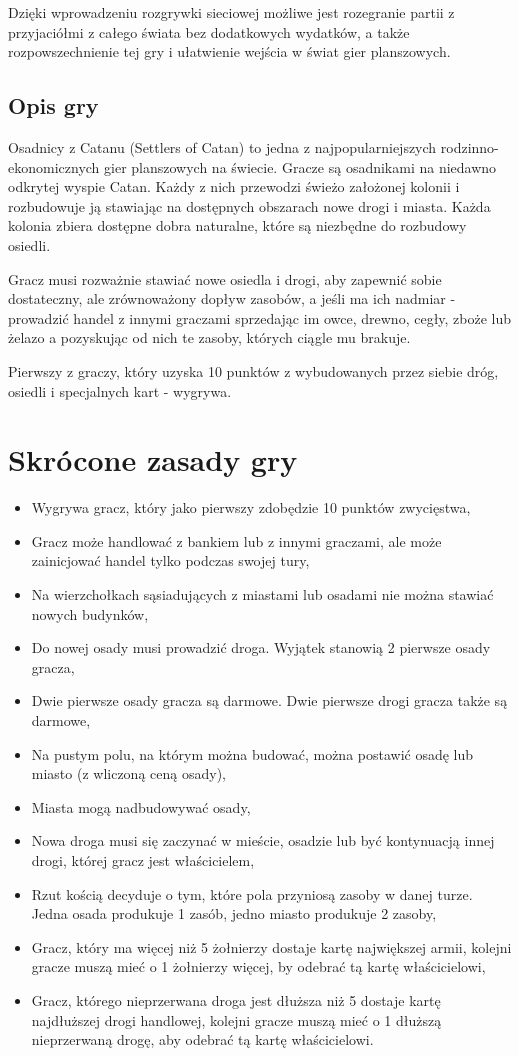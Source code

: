\documentclass[a4paper, 11pt]{article}
\begin{document}
	Dzięki wprowadzeniu rozgrywki sieciowej możliwe jest rozegranie partii z przyjaciółmi z całego świata bez dodatkowych wydatków, a także rozpowszechnienie tej gry i ułatwienie wejścia w świat gier planszowych. 
	\subsection{Opis gry}
	\indent
	
Osadnicy z Catanu (Settlers of Catan) to jedna z najpopularniejszych rodzinno-ekonomicznych gier planszowych na świecie. 
Gracze są osadnikami na niedawno odkrytej wyspie Catan. Każdy z nich przewodzi świeżo założonej kolonii i rozbudowuje ją stawiając na dostępnych obszarach nowe drogi i miasta. Każda kolonia zbiera dostępne dobra naturalne, które są niezbędne do rozbudowy osiedli.
 
Gracz musi rozważnie stawiać nowe osiedla i drogi, aby zapewnić sobie dostateczny, ale zrównoważony dopływ zasobów, a jeśli ma ich nadmiar - prowadzić handel z innymi graczami sprzedając im owce, drewno, cegły, zboże lub żelazo a pozyskując od nich te zasoby, których ciągle mu brakuje.
 
Pierwszy z graczy, który uzyska 10 punktów z wybudowanych przez siebie dróg, osiedli i specjalnych kart - wygrywa.
	
\section{Skrócone zasady gry}
\begin{itemize}
\item Wygrywa gracz, który jako pierwszy zdobędzie 10 punktów zwycięstwa,
\item Gracz może handlować z bankiem lub z innymi graczami, ale może  zainicjować handel tylko podczas swojej tury,
\item Na wierzchołkach sąsiadujących z miastami lub osadami nie można stawiać nowych budynków,
\item Do nowej osady musi prowadzić droga. Wyjątek stanowią 2 pierwsze osady gracza,
\item Dwie pierwsze osady gracza są darmowe. Dwie pierwsze drogi gracza także są darmowe,
\item Na pustym polu, na którym można budować, można postawić osadę lub miasto (z wliczoną ceną osady),
\item Miasta mogą nadbudowywać osady,
\item Nowa droga musi się zaczynać w mieście, osadzie lub być kontynuacją innej drogi, której gracz jest właścicielem,
\item Rzut kością decyduje o tym, które pola przyniosą zasoby w danej turze. Jedna osada produkuje 1 zasób, jedno miasto produkuje 2 zasoby,
\item Gracz, który ma więcej niż 5 żołnierzy dostaje kartę największej armii, kolejni gracze muszą mieć o 1 żołnierzy więcej, by odebrać tą kartę właścicielowi,
\item Gracz, którego nieprzerwana droga jest dłuższa niż 5 dostaje kartę najdłuższej drogi handlowej, kolejni gracze muszą mieć o 1 dłuższą nieprzerwaną drogę, aby odebrać tą kartę właścicielowi.
\end{itemize}
\end{document}
